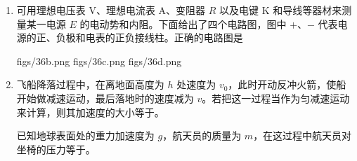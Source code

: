 \documentclass[\gkver]{gaokaozhenti}
\begin{document}
\begin{enumerate}
{$\frac{l^2mv_{0}^{2}}{qd^2}$}
{$\frac{lmv_{0}}{qd}$}
{$\frac{qmv_{0}}{dl}$}


\item
可用理想电压表 V、理想电流表 A、变阻器 $R$ 以及电键 K 和导线等器材来测量某一电源 $E$ 的电动势和内阻。下面给出了四个电路图，图中 $+$、$-$ 代表电源的正、负极和电表的正负接线柱。正确的电路图是

{figs/36b.png}
{figs/36c.png}
{figs/36d.png}


\item
飞船降落过程中，在离地面高度为 $h$ 处速度为 $v_{0}$，此时开动反冲火箭，使船开始做减速运动，最后落地时的速度减为 $v$。若把这一过程当作为匀减速运动来计算，则其加速度的大小等于。

已知地球表面处的重力加速度为 $g$，航天员的质量为 $m$，在这过程中航天员对坐椅的压力等于。

\end{enumerate}
\end{document}
